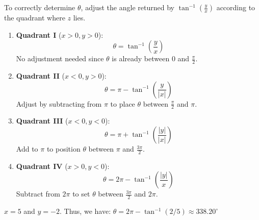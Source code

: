 \documentclass[a4paper, 10pt ]{article} %
\theoremstyle{definition}
\theoremstyle{plain}
\begin{document}
To correctly determine \( \theta \), adjust the angle returned by \(\tan^{-1}\left(\frac{y}{x}\right)\) according to the quadrant where \( z \) lies.

\begin{enumerate}
  \item \textbf{Quadrant I} (\( x > 0, y > 0 \)):
        \[
          \theta = \tan^{-1}\left(\frac{y}{x}\right)
        \]
        No adjustment needed since \( \theta \) is already between \( 0 \) and \( \frac{\pi}{2} \).

  \item \textbf{Quadrant II} (\( x < 0, y > 0 \)):
        \[
          \theta = \pi - \tan^{-1}\left(\frac{y}{|x|}\right)
        \]
        Adjust by subtracting from \( \pi \) to place \( \theta \) between \( \frac{\pi}{2} \) and \( \pi \).

  \item \textbf{Quadrant III} (\( x < 0, y < 0 \)):
        \[
          \theta = \pi + \tan^{-1}\left(\frac{|y|}{|x|}\right)
        \]
        Add to \( \pi \) to position \( \theta \) between \( \pi \) and \( \frac{3\pi}{2} \).

  \item \textbf{Quadrant IV} (\( x > 0, y < 0 \)):
        \[
          \theta = 2\pi - \tan^{-1}\left(\frac{|y|}{x}\right)
        \]
        Subtract from \( 2\pi \) to set \( \theta \) between \( \frac{3\pi}{2} \) and \( 2\pi \).
\end{enumerate}

\begin{examplebox}[Let $z = 5 - 2i$]
  $x = 5$ and $y = -2$. Thus, we have:
  $\theta = 2\pi - \tan^{-1}({2/5}) \approx 338.20^\circ$
  \begin{center}
  \end{center}

\end{examplebox}
\end{document}
